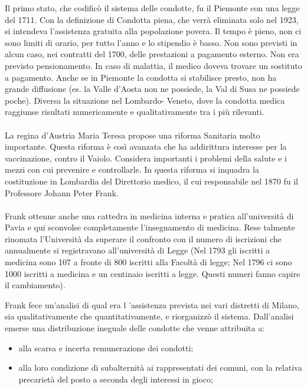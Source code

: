 Il primo stato, che codificò il sistema delle condotte, fu il Piemonte
con una legge del 1711. Con la definizione di Condotta piena, che verrà
eliminata solo nel 1923, si intendeva l'assistenza gratuita alla
popolazione povera. Il tempo è pieno, non ci sono limiti di orario, per
tutto l'anno e lo stipendio è basso. Non sono previsti in alcun caso,
nei contratti del 1700, delle prestazioni a pagamento esterno. Non era
previsto pensionamento. In caso di malattia, il medico doveva trovare un
sostituto a pagamento. Anche se in Piemonte la condotta si stabilisce
presto, non ha grande diffusione (es. la Valle d'Aosta non ne possiede,
la Val di Susa ne possiede poche). Diversa la situazione nel Lombardo-
Veneto, dove la condotta medica raggiunse risultati numericamente e
qualitativamente tra i più rilevanti.
\\\\
La regina d'Austria Maria Teresa propose una riforma Sanitaria molto
importante. Questa riforma è così avanzata che ha addirittura interesse
per la vaccinazione, contro il Vaiolo. Considera importanti i problemi
della salute e i mezzi con cui prevenire e controllarle. In questa
riforma si inquadra la costituzione in Lombardia del Direttorio medico,
il cui responsabile nel 1870 fu il Professore Johann Peter Frank.
\\\\
Frank ottenne anche una cattedra in medicina interna e pratica
all'università di Pavia e qui sconvolse completamente l'insegnamento di
medicina. Rese talmente rinomata l'Università da superare il confronto
con il numero di iscrizioni che annualmente si registravano
all'università di Legge (Nel 1793 gli iscritti a medicina sono 107 a
fronte di 800 iscritti alla Facoltà di legge; Nel 1796 ci sono 1000
iscritti a medicina e un centinaio iscritti a legge. Questi numeri fanno
capire il cambiamento).

Frank fece un'analisi di qual era l 'assistenza prevista nei vari
distretti di Milano, sia qualitativamente che quantitativamente, e
riorganizzò il sistema. Dall'analisi emerse una distribuzione ineguale
delle condotte che venne attribuita a:

\begin{itemize}
\item
  alla scarsa e incerta remunerazione dei condotti;
\item
  alla loro condizione di subalternità ai rappresentati dei comuni, con
  la relativa precarietà del posto a seconda degli interessi in gioco;
\end{itemize}

